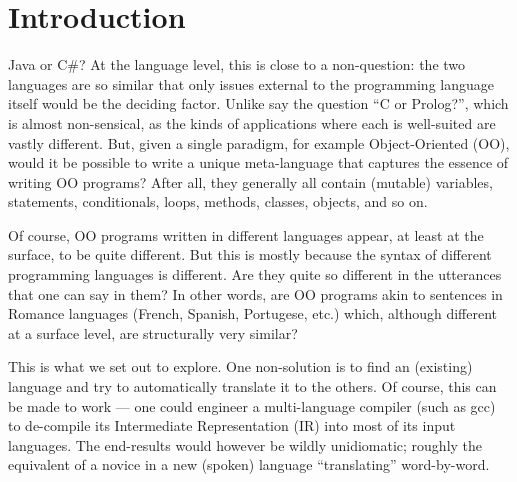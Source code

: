 \documentclass[sigplan,review,prologue,dvipsnames]{acmart}
\newcommand{\Csharp}{C\#}
\begin{document}




\maketitle


\section{Introduction}

Java or \Csharp? At the language level, this is close to a 
non-question: the two languages are so similar that only issues
external to the programming language itself would be the 
deciding factor.  Unlike say the question ``C or Prolog?'', which
is almost non-sensical, as the kinds of applications where each
is well-suited are vastly different.  But, given a single
paradigm, for example Object-Oriented (OO), would it be possible to
write a unique meta-language that captures the essence of writing
OO programs?  After all, they generally all contain (mutable)
variables, statements, conditionals, loops, methods, classes, objects,
and so on.

Of course, OO programs written in different languages appear, at
least at the surface, to be quite different. But this is mostly because
the syntax of different programming languages is different. Are they
quite so different in the utterances that one can say in them? In other
words, are OO programs akin to sentences in Romance languages
(French, Spanish, Portugese, etc.) which, although different at a
surface level, are structurally very similar?

This is what we set out to explore.  One non-solution is to find an
(existing) language and try to automatically translate it to the others.
Of course, this can be made to work --- one could
engineer a multi-language compiler (such as gcc) to de-compile its Intermediate 
Representation (IR) into most of its input languages.  The end-results would 
however
be wildly unidiomatic; roughly the equivalent of a novice
in a new (spoken) language ``translating'' word-by-word.
\end{document}
